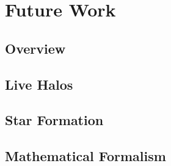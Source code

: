 \chapter{Future Work}

\section{Overview}


\section{Live Halos}


\section{Star Formation}


\section{Mathematical Formalism}

